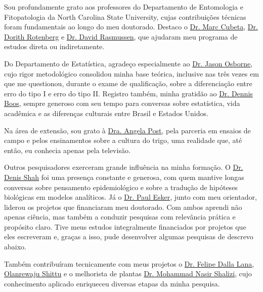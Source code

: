 \documentclass[12pt,a4paper,oneside]{book}
\begin{document}
Sou profundamente grato aos professores do Departamento de Entomologia e Fitopatologia da
North Carolina State University, cujas contribuições técnicas foram fundamentais ao longo do meu doutorado. Destaco o
\href{https://cals.ncsu.edu/entomology-and-plant-pathology/people/macubeta/}{Dr. Marc Cubeta},
\href{https://cals.ncsu.edu/entomology-and-plant-pathology/people/drotenb/}{Dr. Dorith Rotenberg} e
\href{https://phylodynamics.wordpress.ncsu.edu/people/david-rasmussen/}{Dr. David Rasmussen},
que ajudaram meu programa de estudos direta ou indiretamente.

Do Departamento de Estatística, agradeço especialmente ao
\href{https://statistics.sciences.ncsu.edu/people/jaosborn/}{Dr. Jason Osborne}, cujo rigor
metodológico consolidou minha base teórica, inclusive nas três vezes em que me questionou, durante o 
exame de qualificação, sobre a diferenciação entre erro do tipo I e erro do tipo II. Registro também,
minha gratidão ao \href{https://statistics.sciences.ncsu.edu/people/boos/}{Dr. Dennis Boos}, sempre 
generoso com seu tempo para conversas sobre estatística, vida acadêmica e as diferenças 
culturais entre Brasil e Estados Unidos.

Na área de extensão, sou grato à \href{https://www.ces.ncsu.edu/profile/angela-post/}{Dra. Angela Post},
pela parceria em ensaios de campo e pelos ensinamentos sobre a cultura do trigo, uma realidade que, até então, eu conhecia apenas pela televisão.

Outros pesquisadores exerceram grande influência na minha formação. O \href{https://www.linkedin.com/in/denis-shah-28360120}{Dr. Denis Shah}
foi uma presença constante e generosa, com quem mantive longas conversas sobre pensamento
epidemiológico e sobre a tradução de hipóteses biológicas em modelos analíticos. Já o
\href{https://plantpath.psu.edu/directory/pde6}{Dr. Paul Esker},
junto com meu orientador, liderou os projetos que financiaram meu doutorado. Com ambos aprendi não 
apenas ciência, mas também a conduzir pesquisas com relevância prática e propósito claro. Tive meus estudos 
integralmente financiados por projetos que eles escreveram e, graças a isso, pude desenvolver algumas pesquisas de descrevo abaixo.

Também contribuíram tecnicamente com meus projetos o
\href{https://www.lsu.edu/agriculture/ppcp/people/profile/felipe-dalla-lana.php}{Dr. Felipe Dalla Lana},
\href{https://www.linkedin.com/in/olanrewaju-shittu-m/}{Olanrewaju Shittu}
e o melhorista de plantas
\href{https://scholar.google.com/citations?user=kHw-7L4AAAAJ&hl=en}{Dr. Mohammad Nasir Shalizi},
cujo conhecimento aplicado enriqueceu diversas etapas da minha pesquisa.
  
\end{document}
